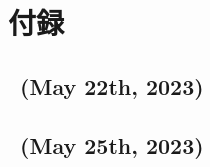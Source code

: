 \setcounter{subsection}{0}
\renewcommand{\thelstlisting}{\thesubsection-\arabic{lstlisting}}
\renewcommand{\thesubsection}{\Alph{subsection}}
\makeatletter
{}
\makeatother
{}
\section*{付録}
\subsection{\kadaia\ (May 22th, 2023)}
% 
% 
\subsection{\kadaib\ (May 25th, 2023)}
